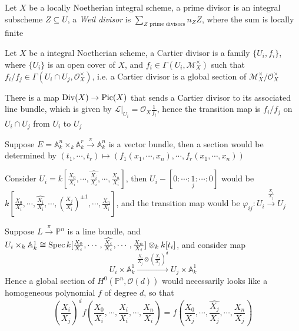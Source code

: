 \documentclass[main]{subfiles}
\begin{document}
\begin{definition}
Let $X$ be a locally Noetherian integral scheme, a prime divisor is an integral subscheme $Z\subseteq U$, a \textit{Weil divisor} is $\displaystyle\sum_{\text{$Z$ prime divisors}} n_ZZ$, where the sum is locally finite
\end{definition}

\begin{definition}
Let $X$ be a integral Noetherian scheme, a Cartier divisor is a family $\{U_i,f_i\}$, where $\{U_i\}$ is an open cover of $X$, and $f_i\in\Gamma(U_i,\mathcal M_X^\times)$ such that $f_i/f_j\in\Gamma(U_i\cap U_j,\mathcal O_X^\times)$, i.e. a Cartier divisor is a global section of $\mathcal M_X^\times/\mathcal O_X^\times$
\end{definition}

\begin{lemma}
There is a map $\operatorname{Div}(X)\to\operatorname{Pic}(X)$ that sends a Cartier divisor to its associated line bundle, which is given by $\mathcal L|_{U_i}=\mathcal O_X\frac{1}{f_i}$, hence the transition map is $f_i/f_j$ on $U_i\cap U_j$ from $U_i$ to $U_j$
\end{lemma}

\begin{example}
Suppose $E=\mathbb A^n_k\times_k\mathbb A^r_k\xrightarrow{\pi}\mathbb A^n_k$ is a vector bundle, then a section would be determined by $(t_1,\cdots,t_r)\mapsto(f_1(x_1,\cdots,x_n),\cdots,f_r(x_1,\cdots,x_n))$
\end{example}

\begin{definition}
Consider $U_i=k[\frac{X_0}{X_i},\cdots,\widehat{\frac{X_i}{X_i}},\cdots,\frac{X_n}{X_i}]$, then $U_i-[0:\cdots:\underset{j}{1}:\cdots:0]$ would be $k[\frac{X_0}{X_i},\cdots,\widehat{\frac{X_i}{X_i}},\cdots,(\frac{X_j}{X_i})^{\pm1},\cdots,\frac{X_n}{X_i}]$, and the transition map would be $\varphi_{ij}:U_i\xrightarrow{\frac{X_i}{X_j}} U_j$
\end{definition}

\begin{definition}
Suppose $L\xrightarrow{\pi}\mathbb P^n$ is a line bundle, and $U_i\times_k\mathbb A^1_k\cong\operatorname{Spec} k[\frac{X_0}{X_i},\cdots,\widehat{\frac{X_i}{X_i}},\cdots,\frac{X_n}{X_i}]\otimes_kk[t_i]$, and consider map
\[
U_i\times\mathbb A^1_k\xrightarrow{\frac{X_i}{X_j}\otimes(\frac{X_i}{X_j})^d} U_j\times\mathbb A^1_k
\]
Hence a global section of $H^0(\mathbb P^n,\mathcal O(d))$ would necessarily looks like a homogeneous polynomial $f$ of degree $d$, so that
\[
(\frac{X_i}{X_j})^df(\frac{X_0}{X_i},\cdots,\widehat{\frac{X_i}{X_i}},\cdots,\frac{X_n}{X_i})=f(\frac{X_0}{X_j},\cdots,\widehat{\frac{X_j}{X_j}},\cdots,\frac{X_n}{X_j})
\]
\end{definition}
\end{document}
